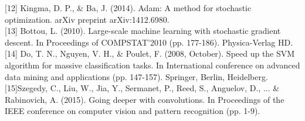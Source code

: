 \documentclass[runningheads]{llncs}
\begin{document}
[12] Kingma, D. P., \& Ba, J. (2014). Adam: A method for stochastic optimization. arXiv preprint arXiv:1412.6980.\\

[13] Bottou, L. (2010). Large-scale machine learning with stochastic gradient descent. In Proceedings of COMPSTAT'2010 (pp. 177-186). Physica-Verlag HD.\\

[14] Do, T. N., Nguyen, V. H., \& Poulet, F. (2008, October). Speed up the SVM algorithm for massive classification tasks. In International conference on advanced data mining and applications (pp. 147-157). Springer, Berlin, Heidelberg.\\

[15]Szegedy, C., Liu, W., Jia, Y., Sermanet, P., Reed, S., Anguelov, D., ... \& Rabinovich, A. (2015). Going deeper with convolutions. In Proceedings of the IEEE conference on computer vision and pattern recognition (pp. 1-9).\\
\end{document}
